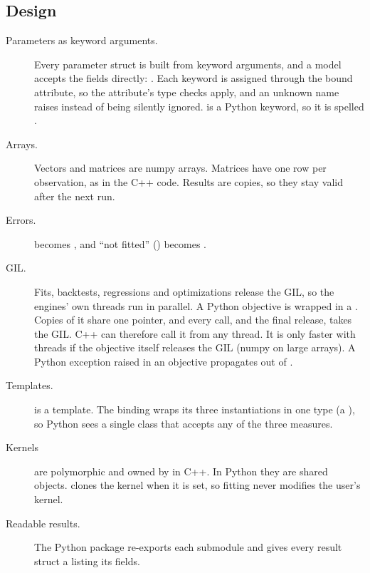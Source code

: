\documentclass[11pt,a4paper]{article}
\makeatletter
\newcommand{\snippetsource}[1]{\csname snippet@#1\endcsname}
\newcommand{\snippet}[3]{%
  }
\makeatother
\begin{document}
\subsection{Design}
\begin{description}
  \item[Parameters as keyword arguments.] Every parameter struct is built from keyword
        arguments, and a model accepts the fields directly:
        . Each keyword is assigned through the bound
        attribute, so the attribute's type checks apply, and an unknown name raises
         instead of being silently ignored.  is a Python
        keyword, so it is spelled .
  \item[Arrays.] Vectors and matrices are  numpy arrays. Matrices have one row
        per observation, as in the C++ code. Results are copies, so they stay valid after
        the next run.
  \item[Errors.]  becomes , and ``not fitted''
        () becomes .
  \item[GIL.] Fits, backtests, regressions and optimizations release the GIL, so the
        engines' own threads run in parallel. A Python objective is wrapped in a
        . Copies of it share one pointer, and every call, and the final
        release, takes the GIL. C++ can therefore call it from any thread. It is only
        faster with threads if the objective itself releases the GIL (numpy on large
        arrays). A Python exception raised in an objective propagates out of
        .
  \item[Templates.]  is a template. The binding wraps its
        three instantiations in one  type (a ),
        so Python sees a single  class that accepts any of the three
        measures.
  \item[Kernels] are polymorphic and owned by  in C++. In Python they
        are shared objects.  clones the kernel when it is set,
        so fitting never modifies the user's kernel.
  \item[Readable results.] The Python package re-exports each submodule and gives every
        result struct a  listing its fields.
\end{description}
\snippet{bridge_kwargs}{C++}{Parameter structs from keyword arguments}
\snippet{bridge_pycallable}{C++}{A Python callable usable from any C++ thread}
\end{document}
